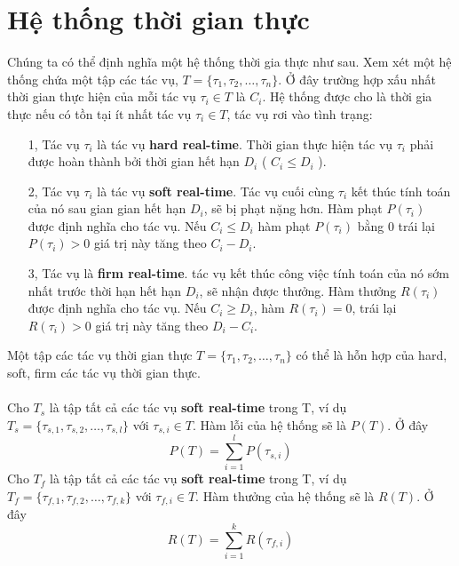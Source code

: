 \documentclass[a4paper,10pt]{report}
\begin{document}
\section{Hệ thống thời gian thực}
Chúng ta có thể định nghĩa một hệ thống thời gia thực như sau. Xem xét một hệ thống chứa một tập các tác vụ, $T = \{\tau_1 , \tau_2, \ldots , \tau_n \}$. Ở đây trường hợp xấu nhất thời gian thực hiện của mỗi tác vụ $\tau_i \in T$ là $C_i$. Hệ thống được cho là thời gia thực nếu có tồn tại ít nhất tác vụ $\tau_i \in T$, tác vụ rơi vào tình trạng:
\begin{itemize}
\item[1, ] Tác vụ $\tau_i$ là tác vụ \textbf{hard real-time}. Thời gian thực hiện tác vụ $\tau_i$ phải được hoàn thành bởi thời gian hết hạn $D_i$ ( $C_i \leq D_i$ ).
\item[2, ] Tác vụ $\tau_i$ là tác vụ \textbf{soft real-time}. Tác vụ cuối cùng $\tau_i$ kết thúc tính toán của nó sau gian gian hết hạn $D_i$, sẽ bị phạt nặng hơn. Hàm phạt $P(\tau_i)$ được định nghĩa cho tác vụ. Nếu $C_i \leq D_i$ hàm phạt $P(\tau_i)$ bằng 0 trái lại $P(\tau_i) > 0$ giá trị này tăng theo $C_i - D_i$.
\item[3, ] Tác vụ là \textbf{firm real-time}. tác vụ kết thúc công việc tính toán của nó sớm nhất trước thời hạn hết hạn $D_i$, sẽ nhận được thưởng. Hàm thưởng $R(\tau_i)$ được định nghĩa cho tác vụ. Nếu $C_i \geq D_i$, hàm $R(\tau_i) = 0$, trái lại $R(\tau_i) > 0$ giá trị này tăng theo $D_i - C_i$.
\end{itemize}
Một tập các tác vụ thời gian thực $T = \{\tau_1, \tau_2, \ldots, \tau_n\}$ có thể là hỗn hợp của hard, soft, firm các tác vụ thời gian thực. \\ \\
Cho $T_s$ là tập tất cả các tác vụ \textbf{soft real-time} trong T, ví dụ $T_s = \{\tau_{s,1}, \tau_{s,2}, \ldots, \tau_{s,l}\}$ với $\tau_{s,i} \in T$. Hàm lỗi của hệ thống sẽ là $P(T)$. Ở đây 
\begin{displaymath}
P(T) = \sum_{i = 1}^{l} P(\tau_{s,i})
\end{displaymath}
Cho $T_f$ là tập tất cả các tác vụ \textbf{soft real-time} trong T, ví dụ $T_f = \{\tau_{f,1}, \tau_{f,2}, \ldots, \tau_{f,k}\}$ với $\tau_{f,i} \in T$. Hàm thưởng của hệ thống sẽ là $R(T)$. Ở đây 
\begin{displaymath}
R(T) = \sum_{i = 1}^{k} R(\tau_{f,i})
\end{displaymath}
\end{document}
